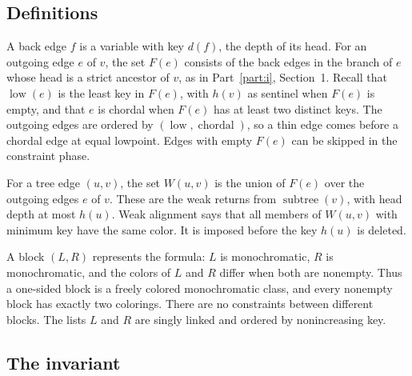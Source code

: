 \documentclass[11pt]{article}
\DeclareMathOperator{\low}{low}
\DeclareMathOperator{\chordal}{chordal}
\DeclareMathOperator{\subtree}{subtree}
\begin{document}
\subsection*{Definitions}

A back edge $f$ is a variable with key $d(f)$, the depth of its head. For an
outgoing edge $e$ of $v$, the set $F(e)$ consists of the back edges in the
branch of $e$ whose head is a strict ancestor of $v$, as in Part~\ref{part:i},
Section~1. Recall that $\low(e)$ is the least key in $F(e)$, with $h(v)$ as
sentinel when $F(e)$ is empty, and that $e$ is chordal when $F(e)$ has at least
two distinct keys. The outgoing edges are ordered by $(\low,\chordal)$, so a
thin edge comes before a chordal edge at equal lowpoint. Edges with empty $F(e)$
can be skipped in the constraint phase.

For a tree edge $(u,v)$, the set $W(u,v)$ is the union of $F(e)$ over the
outgoing edges $e$ of $v$. These are the weak returns from $\subtree(v)$, with
head depth at most $h(u)$. Weak alignment says that all members of $W(u,v)$
with minimum key have the same color. It is imposed before the key $h(u)$ is
deleted.

A block $(L,R)$ represents the formula: $L$ is monochromatic, $R$ is
monochromatic, and the colors of $L$ and $R$ differ when both are nonempty.
Thus a one-sided block is a freely colored monochromatic class, and every
nonempty block has exactly two colorings. There are no constraints between
different blocks. The lists $L$ and $R$ are singly linked and ordered by
nonincreasing key.

\subsection*{The invariant}
\end{document}
